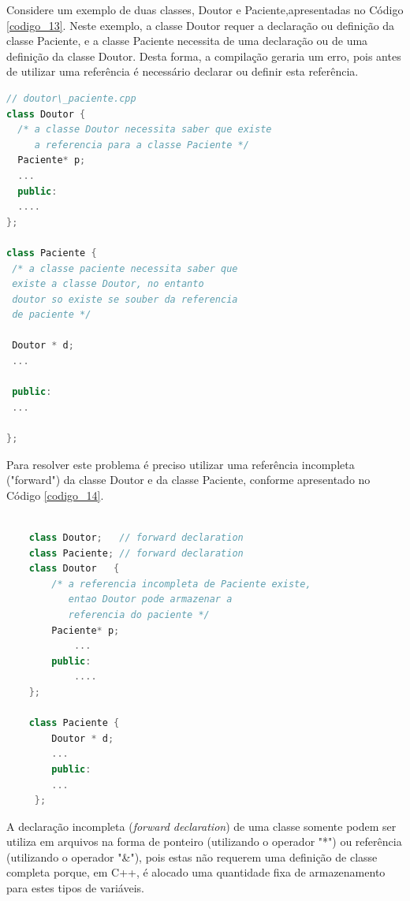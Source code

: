 Considere um exemplo de duas classes, Doutor e Paciente,apresentadas no 
Código \ref{codigo_13}. Neste exemplo, a classe Doutor requer a 
declaração ou definição da classe Paciente, e a classe Paciente necessita 
de uma declaração ou de uma definição da classe Doutor. Desta forma, a 
compilação geraria um erro, pois antes de utilizar uma referência é 
necessário declarar ou definir esta referência.

\begin{lstlisting}[language=C++,frame=single,title={Código 13: 
                   Arquivo com Declaração de Paciente e Doutor},
                                                label=codigo_13]
// doutor\_paciente.cpp
class Doutor {
  /* a classe Doutor necessita saber que existe 
     a referencia para a classe Paciente */
  Paciente* p; 
  ...          
  public:
  ....
};

class Paciente {
 /* a classe paciente necessita saber que 
 existe a classe Doutor, no entanto
 doutor so existe se souber da referencia
 de paciente */

 Doutor * d; 
 ...  

 public:
 ...  

};

\end{lstlisting}

Para resolver este problema é preciso utilizar uma 
referência incompleta ("forward") da classe Doutor e da
 classe Paciente, conforme apresentado no Código \ref{codigo_14}. 


\begin{lstlisting}[language=C++,frame=single,title={Código 14: 
                   Arquivo com Declaração de Paciente e Doutor},
                                                label=codigo_14]

    class Doutor;   // forward declaration
    class Paciente; // forward declaration
    class Doutor   {
        /* a referencia incompleta de Paciente existe,
           entao Doutor pode armazenar a 
           referencia do paciente */
        Paciente* p; 
            ... 
        public: 
            .... 
    };
    
    class Paciente {
        Doutor * d; 
        ... 
        public: 
        ...
     };

\end{lstlisting}

A declaração incompleta (\textit{forward declaration}) de uma classe somente podem
 ser utiliza em arquivos na forma de ponteiro (utilizando o operador "*")
 ou referência (utilizando o operador "\&"), pois estas não requerem uma
 definição de classe completa porque, em C++, é alocado uma quantidade fixa
 de armazenamento para estes tipos de variáveis\cite{ref43}.

